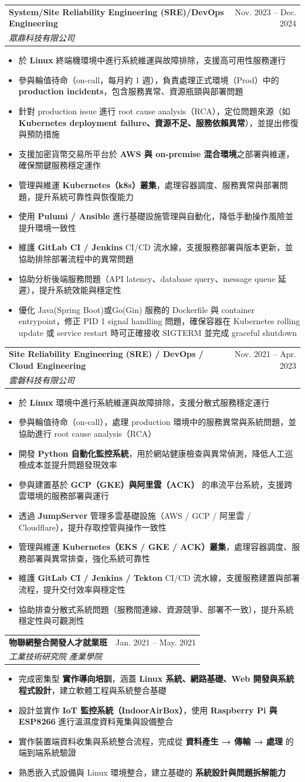 \documentclass[letterpaper,11pt]{article}
\makeatletter
\newcommand{\resumeItem}[1]{
  \item\small{
    {#1 \vspace{-1pt}}
  }
}
\newcommand{\resumeSubheading}[4]{
  \vspace{-1pt}\item
    \begin{tabular*}{\textwidth}[t]{l@{\extracolsep{\fill}}r}
      \textbf{#1} & {\color{dark-grey}\small #2}\vspace{1pt}\\ %
      \textit{#3} & {\color{dark-grey} \small #4}\\ %
    \end{tabular*}\vspace{-4pt}
}
\newcommand{\resumeItemListStart}{\begin{itemize}}
\newcommand{\resumeItemListEnd}{\end{itemize}\vspace{0pt}}
\makeatother
\begin{document}
\resumeSubheading
  {System/Site Reliability Engineering (SRE)/DevOps Engineering}{Nov. 2023 -- Dec. 2024}
  {眾鼎科技有限公司}{}  
  \resumeItemListStart
    \resumeItem{於 \textbf{Linux} 終端機環境中進行系統維運與故障排除，支援高可用性服務運行}
    \resumeItem{參與輪值待命（on-call，每月約 1 週），負責處理正式環境（Prod）中的 \textbf{production incidents}，包含服務異常、資源瓶頸與部署問題}
    \resumeItem{針對 production issue 進行 root cause analysis（RCA），定位問題來源（如 \textbf{Kubernetes deployment failure、資源不足、服務依賴異常}），並提出修復與預防措施}
    \resumeItem{支援加密貨幣交易所平台於 \textbf{AWS 與 on-premise 混合環境}之部署與維運，確保關鍵服務穩定運作}
    \resumeItem{管理與維運 \textbf{Kubernetes（k8s）叢集}，處理容器調度、服務異常與部署問題，提升系統可靠性與恢復能力}
    \resumeItem{使用 \textbf{Pulumi / Ansible} 進行基礎設施管理與自動化，降低手動操作風險並提升環境一致性}
    \resumeItem{維護 \textbf{GitLab CI / Jenkins} CI/CD 流水線，支援服務部署與版本更新，並協助排除部署流程中的異常問題}
    \resumeItem{協助分析後端服務問題（API latency、database query、message queue 延遲），提升系統效能與穩定性}
    \resumeItem{優化 Java(Spring Boot)或Go(Gin) 服務的 Dockerfile 與 container entrypoint，修正 PID 1 signal handling 問題，確保容器在 Kubernetes rolling update 或 service restart 時可正確接收 SIGTERM 並完成 graceful shutdown}
  \resumeItemListEnd

\resumeSubheading
  {Site Reliability Engineering (SRE) / DevOps / Cloud Engineering}{Nov. 2021 -- Apr. 2023}
  {雲磐科技有限公司}{}  
  \resumeItemListStart
    \resumeItem{於 \textbf{Linux} 環境中進行系統維運與故障排除，支援分散式服務穩定運行}
    \resumeItem{參與輪值待命（on-call），處理 production 環境中的服務異常與系統問題，並協助進行 root cause analysis（RCA）}
    \resumeItem{開發 \textbf{Python 自動化監控系統}，用於網站健康檢查與異常偵測，降低人工巡檢成本並提升問題發現效率}
    \resumeItem{參與建置基於 \textbf{GCP（GKE）與阿里雲（ACK）} 的串流平台系統，支援跨雲環境的服務部署與運行}
    \resumeItem{透過 \textbf{JumpServer} 管理多雲基礎設施（AWS / GCP / 阿里雲 / Cloudflare），提升存取控管與操作一致性}
    \resumeItem{管理與維運 \textbf{Kubernetes（EKS / GKE / ACK）叢集}，處理容器調度、服務部署與異常排查，強化系統可靠性}
    \resumeItem{維護 \textbf{GitLab CI / Jenkins / Tekton} CI/CD 流水線，支援服務建置與部署流程，提升交付效率與穩定性}
    \resumeItem{協助排查分散式系統問題（服務間連線、資源競爭、部署不一致），提升系統穩定性與可觀測性}
  \resumeItemListEnd

\resumeSubheading
  {物聯網整合開發人才就業班}{Jan. 2021 -- May. 2021}
  {工業技術研究院 產業學院}{}
  \resumeItemListStart
    \resumeItem{完成密集型 \textbf{實作導向培訓}，涵蓋 \textbf{Linux 系統、網路基礎、Web 開發與系統程式設計}，建立軟體工程與系統整合基礎}
    \resumeItem{設計並實作 \textbf{IoT 監控系統（IndoorAirBox）}，使用 \textbf{Raspberry Pi 與 ESP8266} 進行溫濕度資料蒐集與設備整合}
    \resumeItem{實作裝置端資料收集與系統整合流程，完成從 \textbf{資料產生 → 傳輸 → 處理} 的端到端系統驗證}
    \resumeItem{熟悉嵌入式設備與 Linux 環境整合，建立基礎的 \textbf{系統設計與問題拆解能力}}
  \resumeItemListEnd
\end{document}
